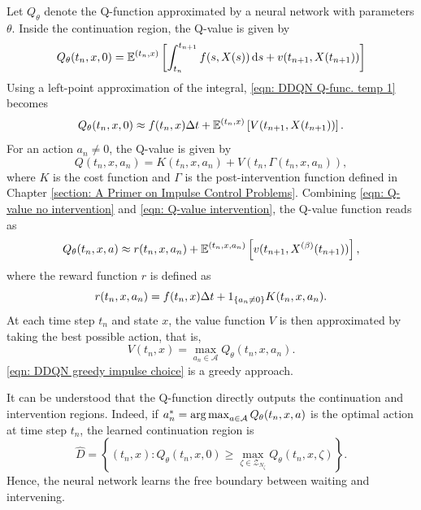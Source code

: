 Let $Q_\theta$ denote the Q-function approximated by a neural network with parameters $\theta$. Inside the continuation region, the Q-value is given by
\begin{equation}
    Q_\theta(t_n,x,0) = \mathbb{E}^{(t_n,x)}\left[\int_{t_n}^{t_{n+1}} f(s,X(s)) \,\mathrm{d} s + v(t_{n+1}, X(t_{n+1})) \right]
    \label{eqn: DDQN Q-func. temp 1}
\end{equation}
Using a left-point approximation of the integral, \eqref{eqn: DDQN Q-func. temp 1} becomes
\begin{equation}
    Q_\theta(t_n,x,0) \approx f(t_n,x) \Delta t + \mathbb{E}^{(t_n,x)}\left[V(t_{n+1}, X(t_{n+1})) \right]. 
    \label{eqn: Q-value no intervention}
\end{equation}
For an action $a_n \neq 0$, the Q-value is given by
\begin{equation}
    Q(t_n,x,a_n) = K(t_n,x,a_n) + V(t_n, \Gamma(t_n,x,a_n)),
    \label{eqn: Q-value intervention}
\end{equation}
where $K$ is the cost function and $\Gamma$ is the post-intervention function defined in Chapter \ref{section: A Primer on Impulse Control Problems}. Combining \eqref{eqn: Q-value no intervention} and \eqref{eqn: Q-value intervention}, the Q-value function reads as
\begin{equation*}
    Q_\theta(t_n,x,a) \approx r(t_n,x,a_n) + \mathbb{E}^{(t_n,x,a_n)}\left[v(t_{n+1}, X^{(\beta)}(t_{n+1})) \right],
\end{equation*}
where the reward function $r$ is defined as
\begin{equation*}
    r(t_n,x,a_n) = f(t_n,x) \Delta t + 1_{\left\{a_n \neq 0\right\}}K(t_n,x,a_n).
\end{equation*}
At each time step $t_n$ and state $x$, the value function $V$ is then approximated by taking the best possible action, that is,
\begin{equation}
    V(t_n,x) = \max_{a_n \in \mathcal{A}} Q_\theta(t_n,x,a_n).
    \label{eqn: DDQN greedy impulse choice}
\end{equation}
\eqref{eqn: DDQN greedy impulse choice} is a greedy approach. 

It can be understood that the Q-function directly outputs the continuation and intervention regions. Indeed, if $a^*_n = \operatorname*{arg\,max}_{a \in \mathcal{A}} Q_\theta(t_n,x,a)$ is the optimal action at time step $t_n$, the learned continuation region is 
\begin{equation*}
    \hat D = \left\{ (t_n,x): Q_\theta (t_n,x,0) \geq \max_{\zeta \in \mathcal{Z}_{N_\zeta}} Q_\theta(t_n,x,\zeta) \right\}.
\end{equation*}
Hence, the neural network learns the free boundary between waiting and intervening.

